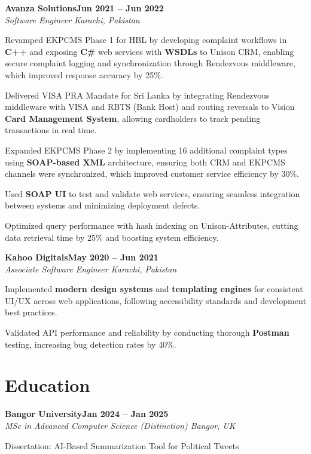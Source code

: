 \documentclass[letterpaper,10pt]{article}
\newcommand{\headingBf}[2]{
  \hspace{10pt}\textbf{#1}\hfill\textbf{#2}\\
}
\newcommand{\headingIt}[2]{
  \hspace{10pt}\textit{#1}\hfill\textit{#2}\\
}
\newenvironment{resume_list}{
  \vspace{-7pt}
  \begin{itemize}[itemsep=-2px, parsep=1pt, leftmargin=30pt]
}{
  \end{itemize}
}
\begin{document}
\headingBf{Avanza Solutions}{Jun 2021 -- Jun 2022}
\headingIt{Software Engineer \hfill Karachi, Pakistan}{}
\begin{resume_list}
    \item Revamped EKPCMS Phase 1 for HBL by developing complaint workflows in \textbf{C++} and exposing \textbf{C\#} web services with \textbf{WSDLs} to Unison CRM, enabling secure complaint logging and synchronization through Rendezvous middleware, which improved response accuracy by 25\%.
    \item Delivered VISA PRA Mandate for Sri Lanka by integrating Rendezvous middleware with VISA and RBTS (Bank Host) and routing reversals to Vision \textbf{Card Management System}, allowing cardholders to track pending transactions in real time.
    \item Expanded EKPCMS Phase 2 by implementing 16 additional complaint types using \textbf{SOAP-based XML} architecture, ensuring both CRM and EKPCMS channels were synchronized, which improved customer service efficiency by 30\%.
    \item Used \textbf{SOAP UI} to test and validate web services, ensuring seamless integration between systems and minimizing deployment defects.
    \item Optimized query performance with hash indexing on Unison-Attributes, cutting data retrieval time by 25\% and boosting system efficiency.
\end{resume_list}

\headingBf{Kahoo Digitals}{May 2020 -- Jun 2021}
\headingIt{Associate Software Engineer \hfill Karachi, Pakistan}{}
\begin{resume_list}
    \item Implemented \textbf{modern design systems} and \textbf{templating engines} for consistent UI/UX across web applications, following accessibility standards and development best practices.
    \item Validated API performance and reliability by conducting thorough \textbf{Postman} testing, increasing bug detection rates by 40\%.
\end{resume_list}

\section{Education}

\headingBf{Bangor University}{Jan 2024 -- Jan 2025}
\headingIt{MSc in Advanced Computer Science (Distinction) \hfill Bangor, UK}{}
\begin{resume_list}
    \item Dissertation: AI-Based Summarization Tool for Political Tweets
\end{resume_list}
\end{document}
